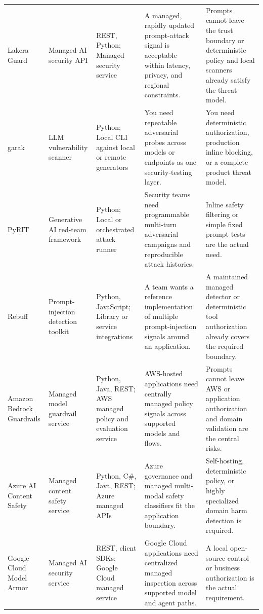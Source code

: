 \begin{longtable}{@{}p{20mm}p{22mm}p{26mm}p{46mm}p{46mm}@{}}
Lakera Guard & Managed AI security API & REST, Python; Managed security service & A managed, rapidly updated prompt-attack signal is acceptable within latency, privacy, and regional constraints. & Prompts cannot leave the trust boundary or deterministic policy and local scanners already satisfy the threat model.\\
garak & LLM vulnerability scanner & Python; Local CLI against local or remote generators & You need repeatable adversarial probes across models or endpoints as one security-testing layer. & You need deterministic authorization, production inline blocking, or a complete product threat model.\\
PyRIT & Generative AI red-team framework & Python; Local or orchestrated attack runner & Security teams need programmable multi-turn adversarial campaigns and reproducible attack histories. & Inline safety filtering or simple fixed prompt tests are the actual need.\\
Rebuff & Prompt-injection detection toolkit & Python, JavaScript; Library or service integrations & A team wants a reference implementation of multiple prompt-injection signals around an application. & A maintained managed detector or deterministic tool authorization already covers the required boundary.\\
Amazon Bedrock Guardrails & Managed model guardrail service & Python, Java, REST; AWS managed policy and evaluation service & AWS-hosted applications need centrally managed policy signals across supported models and flows. & Prompts cannot leave AWS or application authorization and domain validation are the central risks.\\
Azure AI Content Safety & Managed content safety service & Python, C\#, Java, REST; Azure managed APIs & Azure governance and managed multi-modal safety classifiers fit the application boundary. & Self-hosting, deterministic policy, or highly specialized domain harm detection is required.\\
Google Cloud Model Armor & Managed AI security service & REST, client SDKs; Google Cloud managed service & Google Cloud applications need centralized managed inspection across supported model and agent paths. & A local open-source control or business authorization is the actual requirement.\\
\bottomrule\end{longtable}
